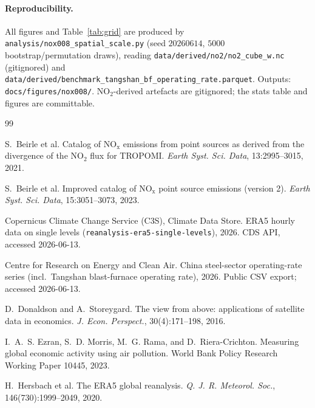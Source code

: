 \documentclass[11pt,a4paper]{article}
\providecommand{\ce}[1]{\ensuremath{\mathrm{#1}}}
\begin{document}
\paragraph{Reproducibility.} All figures and Table~\ref{tab:grid} are produced by
\texttt{analysis/nox008\_spatial\_scale.py} (seed $20260614$, $5000$ bootstrap/permutation draws),
reading \texttt{data/derived/no2/no2\_cube\_w.nc} (gitignored) and
\texttt{data/derived/benchmark\_tangshan\_bf\_operating\_rate.parquet}. Outputs:
\texttt{docs/figures/nox008/}. \ce{NO_2}-derived artefacts are gitignored; the stats table and
figures are committable.

\begin{thebibliography}{99}
\setlength{\itemsep}{0.15em}

S.~Beirle et al.
\newblock Catalog of \ce{NO_x} emissions from point sources as derived from the divergence of the
\ce{NO_2} flux for TROPOMI.
\newblock \emph{Earth Syst. Sci. Data}, 13:2995--3015, 2021.

S.~Beirle et al.
\newblock Improved catalog of \ce{NO_x} point source emissions (version 2).
\newblock \emph{Earth Syst. Sci. Data}, 15:3051--3073, 2023.

Copernicus Climate Change Service (C3S), Climate Data Store.
\newblock ERA5 hourly data on single levels (\texttt{reanalysis-era5-single-levels}), 2026.
\newblock CDS API, accessed 2026-06-13.

Centre for Research on Energy and Clean Air.
\newblock China steel-sector operating-rate series (incl.\ Tangshan blast-furnace operating rate),
2026. Public CSV export; accessed 2026-06-13.

D.~Donaldson and A.~Storeygard.
\newblock The view from above: applications of satellite data in economics.
\newblock \emph{J. Econ. Perspect.}, 30(4):171--198, 2016.

I.~A.~S. Ezran, S.~D. Morris, M.~G. Rama, and D.~Riera-Crichton.
\newblock Measuring global economic activity using air pollution.
\newblock World Bank Policy Research Working Paper 10445, 2023.

H.~Hersbach et al.
\newblock The ERA5 global reanalysis.
\newblock \emph{Q. J. R. Meteorol. Soc.}, 146(730):1999--2049, 2020.


\end{thebibliography}
\end{document}
